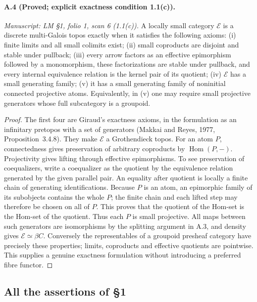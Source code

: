 \paragraph{A.4 (Proved; explicit exactness condition 1.1(c)).}
\textit{Manuscript: LM \S1, folio 1, scan 6 (1.1(c)).}
A locally small category $\mathcal E$ is a discrete multi-Galois topos exactly when it satisfies the following axioms: (i) finite limits and all small colimits exist; (ii) small coproducts are disjoint and stable under pullback; (iii) every arrow factors as an effective epimorphism followed by a monomorphism, these factorizations are stable under pullback, and every internal equivalence relation is the kernel pair of its quotient; (iv) $\mathcal E$ has a small generating family; (v) it has a small generating family of noninitial connected projective atoms. Equivalently, in (v) one may require small projective generators whose full subcategory is a groupoid.
\begin{proof}
The first four are Giraud's exactness axioms, in the formulation as an infinitary pretopos with a set of generators (Makkai and Reyes, 1977, Proposition~3.4.8). They make $\mathcal E$ a Grothendieck topos. For an atom $P$, connectedness gives preservation of arbitrary coproducts by $\operatorname{Hom}(P,-)$. Projectivity gives lifting through effective epimorphisms. To see preservation of coequalizers, write a coequalizer as the quotient by the equivalence relation generated by the given parallel pair. An equality after quotient is locally a finite chain of generating identifications. Because $P$ is an atom, an epimorphic family of its subobjects contains the whole $P$; the finite chain and each lifted step may therefore be chosen on all of $P$. This proves that the quotient of the Hom-set is the Hom-set of the quotient. Thus each $P$ is small projective. All maps between such generators are isomorphisms by the splitting argument in A.3, and density gives $\mathcal E\simeq\beta C$. Conversely the representables of a groupoid presheaf category have precisely these properties; limits, coproducts and effective quotients are pointwise. This supplies a genuine exactness formulation without introducing a preferred fibre functor. 
\end{proof}

\subsection{All the assertions of \S1}

